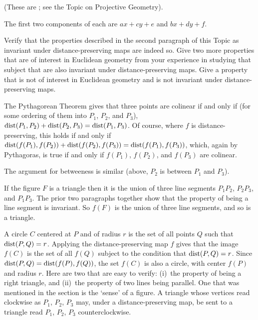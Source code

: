 \begin{exercises}
    (These are 
     ;
     see the Topic on Projective Geometry).
     \begin{answer}
       The first two components of each are $ax+cy+e$ and $bx+dy+f$.
     \end{answer}
  \item \label{exer:GeomInvDistPre}
    \begin{exparts}
     \partsitem Verify that the properties described 
       in the second paragraph of this Topic as invariant
       under distance-preserving maps are indeed so.
     \partsitem Give two more properties that are of interest 
       in Euclidean geometry from your experience in studying that
       subject that are also invariant under distance-preserving maps.
     \partsitem Give a property that is not of interest in Euclidean 
       geometry and is not invariant under distance-preserving maps.
    \end{exparts}
    \begin{answer}
      \begin{exparts}
        \partsitem The Pythagorean Theorem gives that
          three points are 
          colinear if and only if
          (for some ordering of them into $P_1$, $P_2$, and $P_3$),
          $\operatorname{dist}(P_1,P_2)+\operatorname{dist}(P_2,P_3)=\operatorname{dist}(P_1,P_3)$.
          Of course, where $f$ is distance-preserving, this holds
          if and only if
          $\operatorname{dist}(f(P_1),f(P_2))+\operatorname{dist}(f(P_2),f(P_3))=\operatorname{dist}(f(P_1),f(P_3))$,
          which, again by Pythagoras, is true if and only if
          $f(P_1)$, $f(P_2)$, and $f(P_3)$ are colinear.
        
          The argument for betweeness is similar (above, $P_2$ is 
          between $P_1$ and $P_3$).

          If the figure $F$ is a triangle then it is the union of three
          line segments $P_1P_2$, $P_2P_3$, and $P_1P_3$.
          The prior two paragraphs together show that the property of
          being a line segment is invariant.
          So $f(F)$ is the union of three line segments, and so is a 
          triangle.

          A circle $C$ centered at $P$ and of radius $r$ is the set of
          all points $Q$ such that $\operatorname{dist}(P,Q)=r$.
          Applying the distance-preserving map $f$ gives that the image
          $f(C)$ is the set of all $f(Q)$ subject to the condition that
          $\operatorname{dist}(P,Q)=r$.
          Since $\operatorname{dist}(P,Q)=\operatorname{dist}(f(P),f(Q))$, the set $f(C)$ is also
          a circle, with center $f(P)$ and radius $r$.
        \partsitem Here are two that are easy to verify: (i)~the
          property of being a right triangle, and (ii)~the property of
          two lines being parallel.
        \partsitem One that was mentioned in the section is the `sense' of
          a figure.
          A triangle whose vertices read clockwise as $P_1$, $P_2$, $P_3$
          may, under a distance-preserving map, be sent to a triangle
          read $P_1$, $P_2$, $P_3$ counterclockwise.
      \end{exparts}
    \end{answer}
\end{exercises}
\endinput

